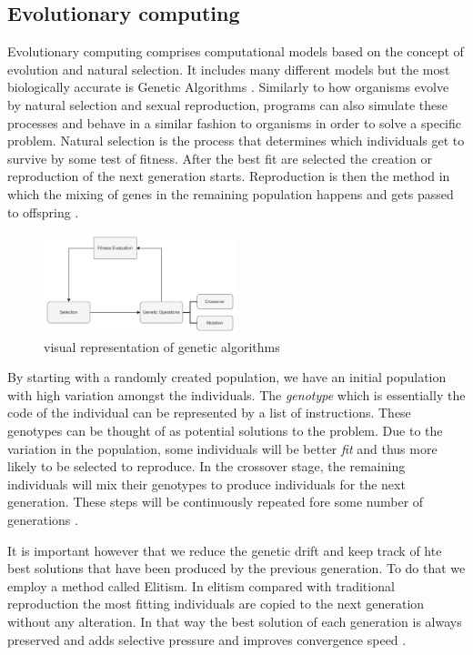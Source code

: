 \subsection{Evolutionary computing}
Evolutionary computing comprises computational models based on the concept of evolution and natural selection. 
It includes many different models but the most biologically accurate is Genetic Algorithms \cite{drugan2019reinforcement}. 
Similarly to how organisms evolve by natural selection and sexual reproduction, programs can also simulate these processes and behave in a similar fashion to organisms in order to solve a specific problem. 
Natural selection is the process that determines which individuals get to survive by some test of fitness. After the best fit are selected the creation or reproduction of the next generation starts. 
Reproduction is then the method in which the mixing of genes in the remaining population happens and gets passed to offspring \cite{holland1992genetic}.

\begin{figure}[H]
    \centering
    \includegraphics [width=0.5\textwidth]{Images/GA_graph.png}
    \caption{visual representation of genetic algorithms}
    \label{figGA}
\end{figure}

By starting with a randomly created population, we have an initial population with high variation amongst the individuals. 
The \textit{genotype} which is essentially the code of the individual can be represented by a list of instructions. 
These genotypes can be thought of as potential solutions to the problem. 
Due to the variation in the population, some individuals will be better \textit{fit} and thus more likely to be selected to reproduce. 
In the crossover stage, the remaining individuals will mix their genotypes to produce individuals for the next generation. 
These steps will be continuously repeated fore some number of generations \cite{forrest1996genetic}. 

It is important however that we reduce the genetic drift and keep track of hte best solutions that have been produced by the previous generation. To do that we employ a method called Elitism. In elitism compared with traditional reproduction the most fitting individuals are copied to the next generation without any alteration. In that way the best solution of each generation is always preserved and adds selective pressure and improves convergence speed \cite{du2018elitism}.


